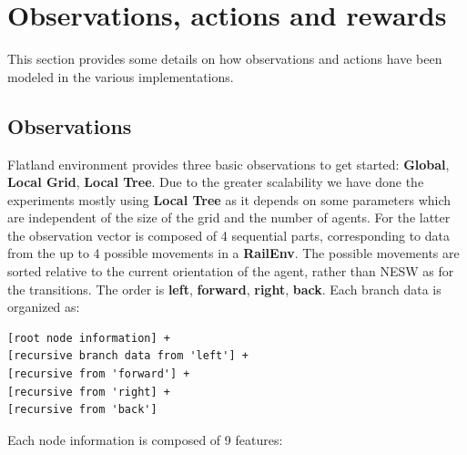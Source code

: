 \documentclass[11pt, a4paper, hidelinks]{report}
\begin{document}
\section{Observations, actions and rewards}\label{sec:observations,-actions-and-rewards}

This section provides some details on how observations and actions have been modeled in the various implementations.

\subsection{Observations}\label{subsec:observations}

Flatland environment provides three basic observations to get started: \textbf{Global}, \textbf{Local Grid}, \textbf{Local Tree}.
Due to the greater scalability we have done the experiments mostly using \textbf{Local Tree} as it depends on some parameters which are independent of the size of the grid and the number of agents.
For the latter the observation vector is composed of 4 sequential parts, corresponding to data from the up to 4 possible movements in a \textbf{RailEnv}.
The possible movements are sorted relative to the current orientation of the agent, rather than NESW as for the transitions.
The order is \textbf{left}, \textbf{forward}, \textbf{right}, \textbf{back}.
Each branch data is organized as:

\begin{lstlisting}[label={lst:tree-obs}]
[root node information] +
[recursive branch data from 'left'] +
[recursive from 'forward'] +
[recursive from 'right] +
[recursive from 'back']
\end{lstlisting}

Each node information is composed of 9 features:
\end{document}

